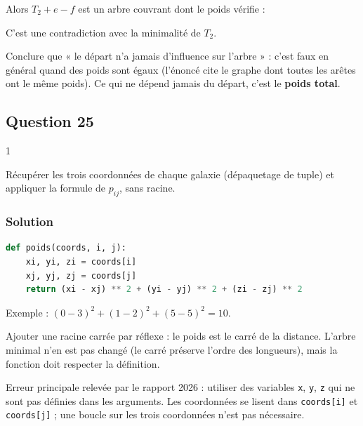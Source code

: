 \documentclass[11pt,a4paper]{article}
\newcommand{\equationajustee}[1]{%
  \sbox{\boiteequation}{$\displaystyle #1$}%
  \ifdim\wd\boiteequation>\linewidth
    \[\resizebox{\linewidth}{!}{\usebox{\boiteequation}}\]%
  \else
    \[#1\]%
  \fi}
\begin{document}
Alors \(T_2 + e - f\) est un arbre couvrant dont le poids vérifie :

\equationajustee{w(T_2) + w(e) - w(f) < w(T_2)}

C'est une contradiction avec la minimalité de \(T_2\).

\begin{piege}

Conclure que « le départ n'a jamais d'influence sur l'arbre » : c'est faux en général quand des poids sont égaux (l'énoncé cite le graphe dont toutes les arêtes ont le même poids). Ce qui ne dépend jamais du départ, c'est le \textbf{poids total}.

\end{piege}

\hypertarget{question-25}{%
\subsection{Question 25}\label{question-25}}

\begin{indication}{1}

Récupérer les trois coordonnées de chaque galaxie (dépaquetage de tuple) et appliquer la formule de \(p_{ij}\), sans racine.

\end{indication}

\hypertarget{solution-24}{%
\subsubsection{Solution}\label{solution-24}}

\begin{lstlisting}[language=Python]
def poids(coords, i, j):
    xi, yi, zi = coords[i]
    xj, yj, zj = coords[j]
    return (xi - xj) ** 2 + (yi - yj) ** 2 + (zi - zj) ** 2
\end{lstlisting}

Exemple : \((0-3)^2 + (1-2)^2 + (5-5)^2 = 10\).

\begin{piege}

Ajouter une racine carrée par réflexe : le poids est le carré de la distance. L'arbre minimal n'en est pas changé (le carré préserve l'ordre des longueurs), mais la fonction doit respecter la définition.

\end{piege}

\begin{piege}

Erreur principale relevée par le rapport 2026 : utiliser des variables \texttt{x}, \texttt{y}, \texttt{z} qui ne sont pas définies dans les arguments. Les coordonnées se lisent dans \texttt{coords{[}i{]}} et \texttt{coords{[}j{]}} ; une boucle sur les trois coordonnées n'est pas nécessaire.

\end{piege}
\end{document}
